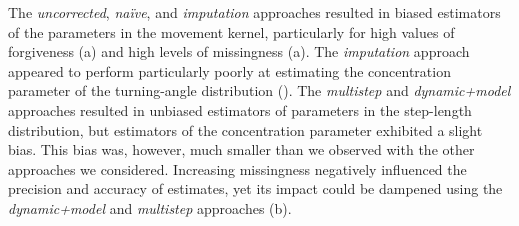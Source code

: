 \documentclass[../FinalThesis.tex]{subfiles}
\begin{document}
The \textit{uncorrected}, \textit{na\"ive}, and \textit{imputation} approaches
resulted in biased estimators of the parameters in the movement kernel,
particularly for high values of forgiveness (a)
and high levels of missingness (a). The
\textit{imputation} approach appeared to perform particularly poorly at
estimating the concentration parameter of the turning-angle distribution
(). The \textit{multistep} and
\textit{dynamic+model} approaches resulted in unbiased estimators of parameters
in the step-length distribution, but estimators of the concentration parameter
exhibited a slight bias. This bias was, however, much smaller than we observed
with the other approaches we considered. Increasing missingness negatively
influenced the precision and accuracy of estimates, yet its impact could be
dampened using the \textit{dynamic+model} and \textit{multistep} approaches
(b).
\end{document}
